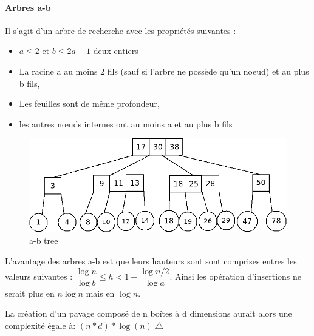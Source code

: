 \paragraph{Arbres a-b}
Il s'agit d'un arbre de recherche avec les propriétés suivantes :
\begin{itemize}
\item
  $a\leq2$ et $b\leq 2a−1$ deux entiers
\item
  La racine a au moins 2 fils (sauf si l'arbre ne possède qu'un noeud) et au plus b fils,
\item 
  Les feuilles sont de même profondeur,
\item
  les autres nœuds internes ont au moins a et au plus b fils
\end{itemize}

\begin{figure}[htbp]
  \centering
  \includegraphics[scale=0.40]{img/abtree}
  \caption{a-b tree}
  \label{fig:dnuages}
\end{figure}


L'avantage des arbres a-b est que leurs hauteurs sont sont comprises entres les valeurs suivantes : $ \dfrac{\log{n}}{\log{b}}   \leq h  < 1 + \dfrac{\log{n/2}}{\log{a}}$. Ainsi les opération d'insertions ne serait plus en $n\log{n}$ mais en $\log{n}$.

La création d'un pavage composé de n boîtes à d dimensions aurait alors une complexité égale à: $(n*d)*\log(n)$ $\triangle$


